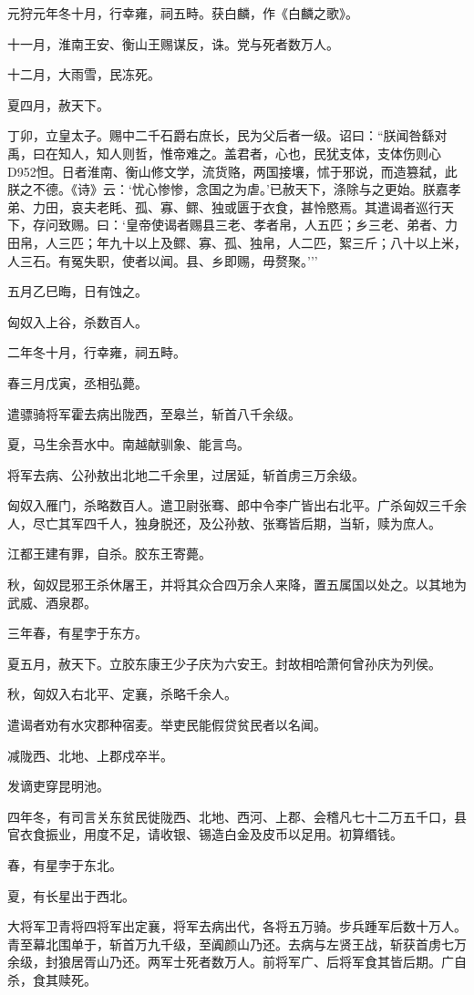 \documentclass[]{article}
\begin{document}
元狩元年冬十月，行幸雍，祠五畤。获白麟，作《白麟之歌》。

十一月，淮南王安、衡山王赐谋反，诛。党与死者数万人。

十二月，大雨雪，民冻死。

夏四月，赦天下。

丁卯，立皇太子。赐中二千石爵右庶长，民为父后者一级。诏曰：``朕闻咎繇对禹，曰在知人，知人则哲，惟帝难之。盖君者，心也，民犹支体，支体伤则心D952怛。日者淮南、衡山修文学，流货赂，两国接壤，怵于邪说，而造篡弑，此朕之不德。《诗》云：`忧心惨惨，念国之为虐。'已赦天下，涤除与之更始。朕嘉孝弟、力田，哀夫老眊、孤、寡、鳏、独或匮于衣食，甚怜愍焉。其遣谒者巡行天下，存问致赐。曰：`皇帝使谒者赐县三老、孝者帛，人五匹；乡三老、弟者、力田帛，人三匹；年九十以上及鳏、寡、孤、独帛，人二匹，絮三斤；八十以上米，人三石。有冤失职，使者以闻。县、乡即赐，毋赘聚。'''

五月乙巳晦，日有蚀之。

匈奴入上谷，杀数百人。

二年冬十月，行幸雍，祠五畤。

春三月戊寅，丞相弘薨。

遣骠骑将军霍去病出陇西，至皋兰，斩首八千余级。

夏，马生余吾水中。南越献驯象、能言鸟。

将军去病、公孙敖出北地二千余里，过居延，斩首虏三万余级。

匈奴入雁门，杀略数百人。遣卫尉张骞、郎中令李广皆出右北平。广杀匈奴三千余人，尽亡其军四千人，独身脱还，及公孙敖、张骞皆后期，当斩，赎为庶人。

江都王建有罪，自杀。胶东王寄薨。

秋，匈奴昆邪王杀休屠王，并将其众合四万余人来降，置五属国以处之。以其地为武威、酒泉郡。

三年春，有星孛于东方。

夏五月，赦天下。立胶东康王少子庆为六安王。封故相哈萧何曾孙庆为列侯。

秋，匈奴入右北平、定襄，杀略千余人。

遣谒者劝有水灾郡种宿麦。举吏民能假贷贫民者以名闻。

减陇西、北地、上郡戍卒半。

发谪吏穿昆明池。

四年冬，有司言关东贫民徙陇西、北地、西河、上郡、会稽凡七十二万五千口，县官衣食振业，用度不足，请收银、锡造白金及皮币以足用。初算缗钱。

春，有星孛于东北。

夏，有长星出于西北。

大将军卫青将四将军出定襄，将军去病出代，各将五万骑。步兵踵军后数十万人。青至幕北围单于，斩首万九千级，至阗颜山乃还。去病与左贤王战，斩获首虏七万余级，封狼居胥山乃还。两军士死者数万人。前将军广、后将军食其皆后期。广自杀，食其赎死。
\end{document}
